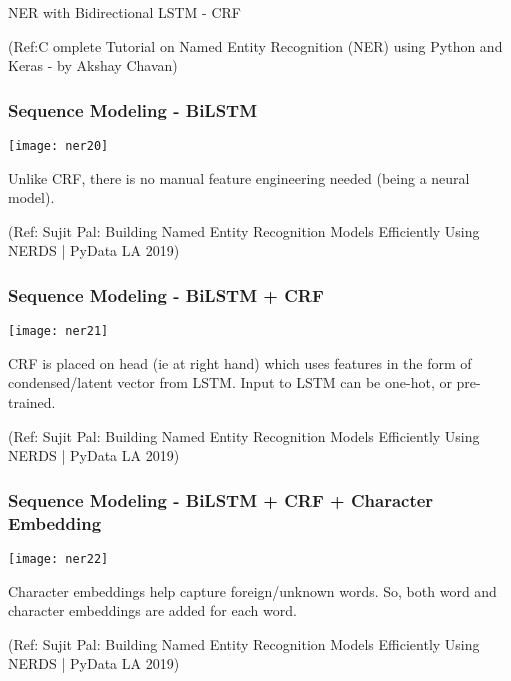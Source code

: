 \begin{frame}[fragile]\frametitle{}

\begin{center}
{\Large NER with Bidirectional LSTM - CRF}

{\tiny (Ref:C omplete Tutorial on Named Entity Recognition (NER) using Python and Keras - by Akshay Chavan)}
\end{center}


\end{frame}

\begin{frame}[fragile]\frametitle{Sequence Modeling - BiLSTM}

\begin{center}
\texttt{[image: ner20]}
\end{center}

Unlike CRF, there is no manual feature engineering needed (being a neural model).

{\tiny (Ref: Sujit Pal: Building Named Entity Recognition Models Efficiently Using NERDS | PyData LA 2019)}

\end{frame}

\begin{frame}[fragile]\frametitle{Sequence Modeling - BiLSTM + CRF}

\begin{center}
\texttt{[image: ner21]}
\end{center}

CRF is placed on head (ie at right hand) which uses features in the form of condensed/latent vector from LSTM.
Input to LSTM can be one-hot, or pre-trained.

{\tiny (Ref: Sujit Pal: Building Named Entity Recognition Models Efficiently Using NERDS | PyData LA 2019)}

\end{frame}

\begin{frame}[fragile]\frametitle{Sequence Modeling - BiLSTM + CRF + Character Embedding}

\begin{center}
\texttt{[image: ner22]}
\end{center}

Character embeddings help capture foreign/unknown words. So, both word and character embeddings are added for each word.

{\tiny (Ref: Sujit Pal: Building Named Entity Recognition Models Efficiently Using NERDS | PyData LA 2019)}

\end{frame}



